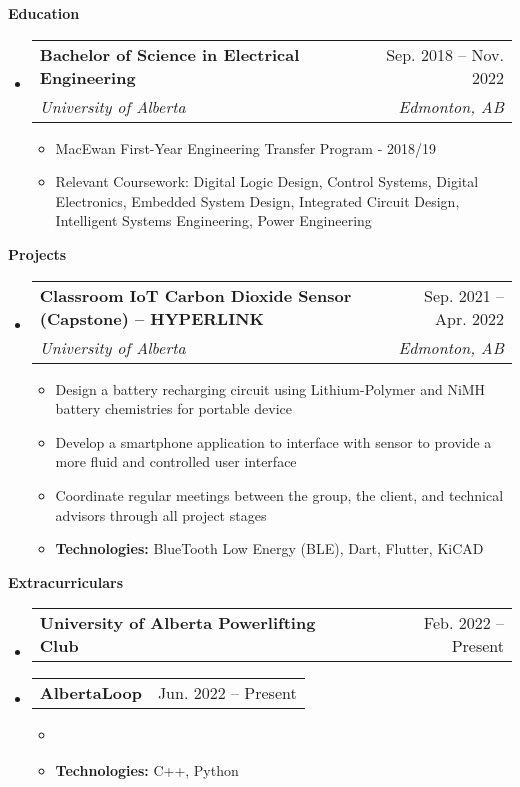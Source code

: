 \documentclass[letterpaper,12pt]{article}[leftmargin=*]
\makeatletter
\def \entryspacing {-0pt}
\renewcommand{\section}[2]{\vspace{5pt}
  \colorbox{secondary}{\color{white}\raggedbottom\normalsize\textbf{{#1}{\hspace{7pt}#2}}}
}
\newcommand{\resumeEntryStart}{\begin{itemize}[leftmargin=2.5mm]}
\newcommand{\resumeEntryEnd}{\end{itemize}\vspace{\entryspacing}}
\newcommand{\resumeItemListStart}{\begin{itemize}[leftmargin=4.5mm]}
\newcommand{\resumeItemListEnd}{\end{itemize}}
\newcommand{\resumeItem}[1]{
  \item\small{
    {#1 \vspace{-2pt}}
  }
}
\newcommand{\resumeEntryTSDL}[4]{
  \vspace{-1pt}\item[]
    \begin{tabularx}{0.97\textwidth}{X@{\hspace{60pt}}r}
      \textbf{\color{primary}#1} & {\firabook\color{accent}\small#2} \\
      \textit{\color{accent}\small#3} & \textit{\color{accent}\small#4} \\
    \end{tabularx}\vspace{-6pt}
}
\newcommand{\resumeEntryTD}[2]{
  \vspace{-1pt}\item[]
    \begin{tabularx}{0.97\textwidth}{X@{\hspace{60pt}}r}
      \textbf{\color{primary}#1} & {\firabook\color{accent}\small#2} \\
    \end{tabularx}\vspace{-6pt}
}
\makeatother
\begin{document}
\section{\faGraduationCap}{Education}

  \resumeEntryStart
    \resumeEntryTSDL
      {Bachelor of Science in Electrical Engineering}{Sep. 2018 -- Nov. 2022}
      {University of Alberta}{Edmonton, AB}
  \resumeItemListStart
    \resumeItem{MacEwan First-Year Engineering Transfer Program - 2018/19}
    \resumeItem{Relevant Coursework: Digital Logic Design, Control Systems, Digital Electronics, Embedded System Design, Integrated Circuit Design, Intelligent Systems Engineering, Power Engineering}
  \resumeItemListEnd
  \resumeEntryEnd

\section{\faFlask}{Projects}

  \resumeEntryStart
    \resumeEntryTSDL
      {Classroom IoT Carbon Dioxide Sensor (Capstone) -- HYPERLINK}{Sep. 2021 -- Apr. 2022}
      {University of Alberta}{Edmonton, AB}
    \resumeItemListStart
      \resumeItem {Design a battery recharging circuit using Lithium-Polymer and NiMH battery chemistries for portable device}
      \resumeItem {Develop a smartphone application to interface with sensor to provide a more fluid and controlled user interface}
      \resumeItem {Coordinate regular meetings between the group, the client, and technical advisors through all project stages}
      \resumeItem {\textbf{Technologies:} BlueTooth Low Energy (BLE), Dart, Flutter, KiCAD}
    \resumeItemListEnd
  \resumeEntryEnd

\section{\faGroup}{Extracurriculars}

 \resumeEntryStart
 \resumeEntryTD{University of Alberta Powerlifting Club}{Feb. 2022 -- Present}
 \resumeEntryEnd

 \resumeEntryStart
 \resumeEntryTD{AlbertaLoop}{Jun. 2022 -- Present}
 \resumeItemListStart
      \resumeItem {}
      \resumeItem {\textbf{Technologies:} C++, Python}
    \resumeItemListEnd
 \resumeEntryEnd
\end{document}
